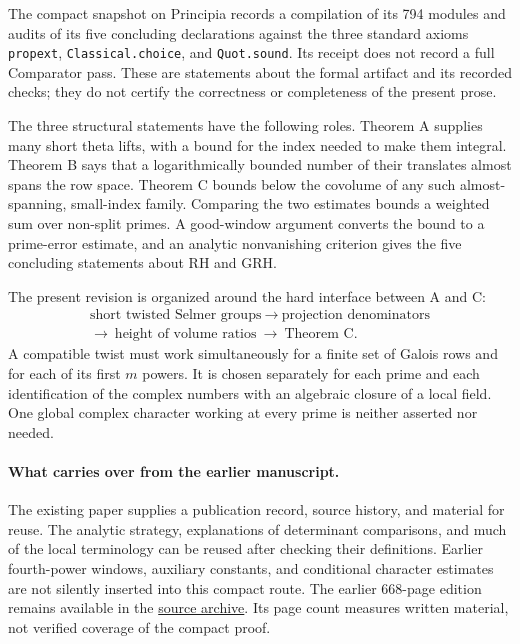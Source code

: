 \documentclass[11pt,a4paper]{article}
\theoremstyle{definition}
\begin{document}
The compact snapshot on Principia records a compilation of its 794 modules and audits
of its five concluding declarations against the three standard axioms
\texttt{propext}, \texttt{Classical.choice}, and \texttt{Quot.sound}.
Its receipt does not record a full Comparator pass. These are statements about the
formal artifact and its recorded checks; they do not certify the correctness or
completeness of the present prose.

The three structural statements have the following roles. Theorem A supplies
many short theta lifts, with a bound for the index needed to make them integral.
Theorem B says that a logarithmically bounded number of their translates almost spans
the row space. Theorem C bounds below the covolume of any such almost-spanning,
small-index family. Comparing the two estimates bounds a weighted sum over non-split
primes. A good-window argument converts the bound to a prime-error estimate, and an
analytic nonvanishing criterion gives the five concluding statements about RH and GRH.

The present revision is organized around the hard interface between A and C:
\[
 \begin{gathered}
 \text{short twisted Selmer groups}\ \longrightarrow\
       \text{projection denominators}\\
 \longrightarrow\ \text{height of volume ratios}
       \ \longrightarrow\ \text{Theorem C}.
 \end{gathered}
\]
A compatible twist must work simultaneously for a finite set of Galois rows and
for each of its first \(m\) powers. It is chosen separately for each prime and each
identification of the complex numbers with an algebraic closure of a local field.
One global complex character working at every prime is neither asserted nor needed.

\paragraph{What carries over from the earlier manuscript.}
The existing paper supplies a publication record, source history, and material for reuse.
The analytic strategy, explanations of determinant comparisons, and much of the local
terminology can be reused after checking their definitions. Earlier fourth-power
windows, auxiliary constants, and conditional character estimates are not silently
inserted into this compact route. The earlier 668-page edition remains available in the
\href{https://github.com/ChristianKudeba/alpoge-rh-verification/releases/tag/short-route-6be17bf2cd8bf8b790193532ca4d7e4616ba5b45}{source archive}.
Its page count measures written material, not verified coverage of the compact proof.
\end{document}
